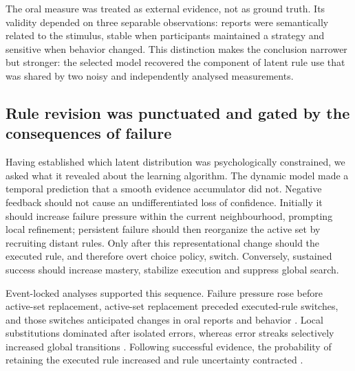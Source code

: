 The oral measure was treated as external evidence, not as ground truth. Its
validity depended on three separable observations: reports were semantically
related to the stimulus, stable when participants maintained a strategy and
sensitive when behavior changed.
This distinction makes the conclusion narrower but stronger: the selected
model recovered the component of latent rule use that was shared by two noisy
and independently analysed measurements.


\subsection{Rule revision was punctuated and gated by the consequences of failure}

Having established which latent distribution was psychologically constrained,
we asked what it revealed about the learning algorithm. The dynamic model made
a temporal prediction that a smooth evidence accumulator did not. Negative
feedback should not cause an undifferentiated loss of confidence. Initially it
should increase failure pressure within the current neighbourhood, prompting
local refinement; persistent failure should then reorganize the active set by
recruiting distant rules. Only after this representational change should the
executed rule, and therefore overt choice policy, switch. Conversely, sustained
success should increase mastery, stabilize execution and suppress global
search.

Event-locked analyses supported this sequence. Failure pressure rose before
active-set replacement, active-set replacement preceded executed-rule switches,
and those switches anticipated changes in oral reports and behavior
. Local substitutions dominated after isolated
errors, whereas error streaks selectively increased global transitions
. Following successful evidence, the probability of
retaining the executed rule increased and rule uncertainty contracted
.

